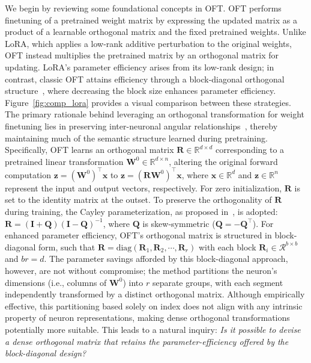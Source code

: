 We begin by reviewing some foundational concepts in OFT. OFT performs finetuning of a pretrained weight matrix by expressing the updated matrix as a product of a learnable orthogonal matrix and the fixed pretrained weights. Unlike LoRA, which applies a low-rank additive perturbation to the original weights, OFT instead multiplies the pretrained matrix by an orthogonal matrix for updating. LoRA’s parameter efficiency arises from its low-rank design; in contrast, classic OFT attains efficiency through a block-diagonal orthogonal structure~\cite{qiu2023controlling}, where decreasing the block size enhances parameter efficiency. Figure~\ref{fig:comp_lora} provides a visual comparison between these strategies. The primary rationale behind leveraging an orthogonal transformation for weight finetuning lies in preserving inter-neuronal angular relationships~\cite{liu2018learning,liu2021orthogonal,qiu2023controlling}, thereby maintaining much of the semantic structure learned during pretraining. Specifically, OFT learns an orthogonal matrix $\bm{R}\in\mathbb{R}^{d\times d}$ corresponding to a pretrained linear transformation $\bm{W}^0\in\mathbb{R}^{d\times n}$, altering the original forward computation $\bm{z}=(\bm{W}^0)^\top\bm{x}$ to $\bm{z}=(\bm{R}\bm{W}^0)^\top\bm{x}$, where $\bm{x}\in\mathbb{R}^{d}$ and $\bm{z}\in\mathbb{R}^{n}$ represent the input and output vectors, respectively. For zero initialization, $\bm{R}$ is set to the identity matrix at the outset. To preserve the orthogonality of $\bm{R}$ during training, the Cayley parameterization, as proposed in~\cite{qiu2023controlling,liu2021orthogonal}, is adopted: $\bm{R}=(\bm{I}+\bm{Q})(\bm{I}-\bm{Q})^{-1}$, where $\bm{Q}$ is skew-symmetric ($\bm{Q}=-\bm{Q}^\top$). For enhanced parameter efficiency, OFT’s orthogonal matrix is structured in block-diagonal form, such that $\bm{R}=\text{diag}(\bm{R}_1,\bm{R}_2,\cdots,\bm{R}_r)$ with each block $\bm{R}_i\in\mathcal{R}^{b\times b}$ and $br=d$. The parameter savings afforded by this block-diagonal approach, however, are not without compromise; the method partitions the neuron's dimensions (i.e., columns of $\bm{W}^0$) into $r$ separate groups, with each segment independently transformed by a distinct orthogonal matrix. Although empirically effective, this partitioning based solely on index does not align with any intrinsic property of neuron representations, making dense orthogonal transformations potentially more suitable. This leads to a natural inquiry: \emph{Is it possible to devise a dense orthogonal matrix that retains the parameter-efficiency offered by the block-diagonal design?}

